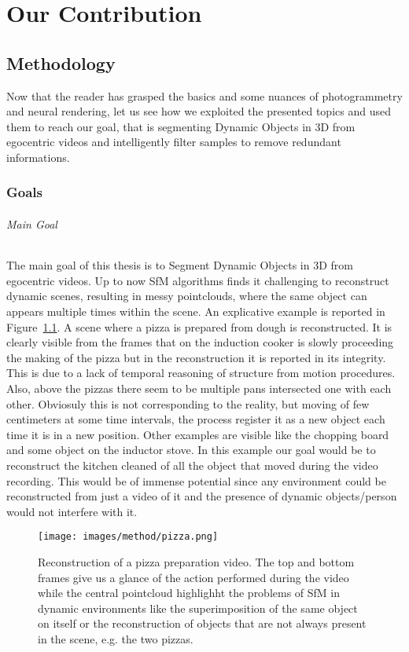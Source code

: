 \part{Our Contribution}
\chapter{Methodology}
Now that the reader has grasped the basics and some nuances of 
photogrammetry and neural rendering, let us see how we exploited 
the presented topics and used them to reach our goal, that is segmenting
Dynamic Objects in 3D from egocentric videos and intelligently filter
samples to remove redundant informations.  
\section{Goals}
\paragraph*{Main Goal}The main goal of this thesis is to Segment Dynamic Objects in 
3D from egocentric videos. Up to now SfM algorithms finds it 
challenging to reconstruct dynamic scenes, resulting in messy
pointclouds, where the same object can appears multiple times 
within the scene. An explicative example is reported in 
Figure~\ref{fig:pizza}. A scene where a pizza is prepared from dough
is reconstructed. It is clearly visible from the frames that on the 
induction cooker is slowly proceeding the making of the pizza but in the
reconstruction it is reported in its integrity. This is due to a lack
of temporal reasoning of structure from motion procedures. Also, above the
pizzas there seem to be multiple pans intersected one with each other.
Obviosuly this is not corresponding to the reality, but moving of few 
centimeters at some time intervals, the process register it as a new 
object each time it is in a new position. Other examples are visible like the 
chopping board and some object on the inductor stove. In this example 
our goal would be to reconstruct the kitchen cleaned of all the object that 
moved during the video recording. This would be of immense potential since any 
environment could be reconstructed from just a video of it and the presence 
of dynamic objects/person would not interfere with it.
\begin{figure}[t]
    \centering
    \texttt{[image: images/method/pizza.png]} 
    \caption{Reconstruction of a pizza preparation video. The top and bottom frames give
    us a glance of the action performed during the video while the central
    pointcloud highlighht the problems of SfM in dynamic environments like the 
    superimposition of the same object on itself or the reconstruction of objects
    that are not always present in the scene, e.g. the two pizzas.}\label{fig:pizza}
\end{figure}


